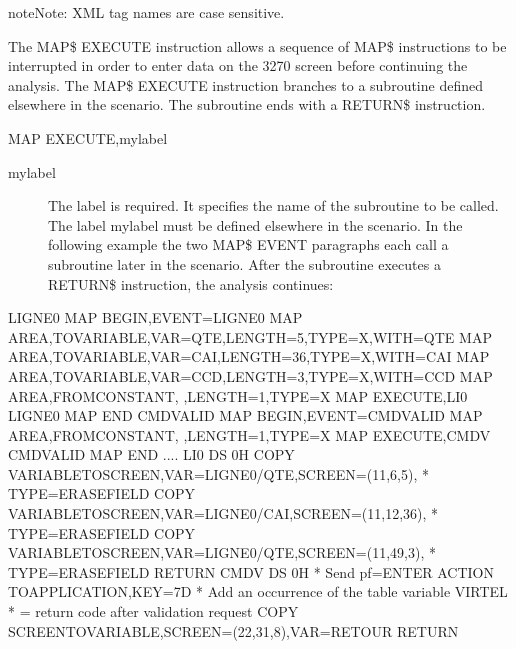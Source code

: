 \documentclass[letterpaper,10pt,english]{sphinxmanual}
\begin{document}
\begin{sphinxadmonition}{note}{Note:}
XML tag names are case sensitive.
\end{sphinxadmonition}
\label{\detokenize{User_Guide:v457ug-map-execute}}

The MAP\$ EXECUTE instruction allows a sequence of MAP\$ instructions to be interrupted in order to enter data on the
3270 screen before continuing the analysis. The MAP\$ EXECUTE instruction branches to a subroutine defined
elsewhere in the scenario. The subroutine ends with a RETURN\$ instruction.

\begin{sphinxVerbatim}[commandchars=\\\{\}]
MAP\PYGZdl{} EXECUTE,mylabel
\end{sphinxVerbatim}
\begin{description}
\item[{mylabel}] \leavevmode
The label is required. It specifies the name of the subroutine to be called. The label mylabel must be defined elsewhere in the scenario. In the following example the two MAP\$ EVENT paragraphs each call a subroutine later in the scenario. After the subroutine executes a RETURN\$ instruction, the analysis continues:

\end{description}

\begin{sphinxVerbatim}[commandchars=\\\{\}]
LIGNE0  MAP\PYGZdl{} BEGIN,EVENT=\PYGZsq{}LIGNE0\PYGZsq{}
        MAP\PYGZdl{} AREA,TO\PYGZhy{}VARIABLE,VAR=\PYGZsq{}QTE\PYGZsq{},LENGTH=5,TYPE=X,WITH=\PYGZsq{}QTE\PYGZsq{}
        MAP\PYGZdl{} AREA,TO\PYGZhy{}VARIABLE,VAR=\PYGZsq{}CAI\PYGZsq{},LENGTH=36,TYPE=X,WITH=\PYGZsq{}CAI\PYGZsq{}
        MAP\PYGZdl{} AREA,TO\PYGZhy{}VARIABLE,VAR=\PYGZsq{}CCD\PYGZsq{},LENGTH=3,TYPE=X,WITH=\PYGZsq{}CCD\PYGZsq{}
        MAP\PYGZdl{} AREA,FROM\PYGZhy{}CONSTANT,\PYGZsq{} \PYGZsq{},LENGTH=1,TYPE=X
        MAP\PYGZdl{} EXECUTE,LI0
LIGNE0  MAP\PYGZdl{} END
CMDVALID MAP\PYGZdl{} BEGIN,EVENT=\PYGZsq{}CMDVALID\PYGZsq{}
         MAP\PYGZdl{} AREA,FROM\PYGZhy{}CONSTANT,\PYGZsq{} \PYGZsq{},LENGTH=1,TYPE=X
         MAP\PYGZdl{} EXECUTE,CMDV
CMDVALID MAP\PYGZdl{} END
....
LI0 DS 0H
        COPY\PYGZdl{} VARIABLE\PYGZhy{}TO\PYGZhy{}SCREEN,VAR=\PYGZsq{}LIGNE0/QTE\PYGZsq{},SCREEN=(11,6,5), *
            TYPE=ERASE\PYGZhy{}FIELD
        COPY\PYGZdl{} VARIABLE\PYGZhy{}TO\PYGZhy{}SCREEN,VAR=\PYGZsq{}LIGNE0/CAI\PYGZsq{},SCREEN=(11,12,36), *
            TYPE=ERASE\PYGZhy{}FIELD
        COPY\PYGZdl{} VARIABLE\PYGZhy{}TO\PYGZhy{}SCREEN,VAR=\PYGZsq{}LIGNE0/QTE\PYGZsq{},SCREEN=(11,49,3), *
            TYPE=ERASE\PYGZhy{}FIELD
        RETURN\PYGZdl{}
CMDV DS 0H
* Send pf=ENTER
        ACTION\PYGZdl{} TO\PYGZhy{}APPLICATION,KEY=7D
* Add an occurrence of the table variable VIRTEL
* = return code after validation request
        COPY\PYGZdl{} SCREEN\PYGZhy{}TO\PYGZhy{}VARIABLE,SCREEN=(22,31,8),VAR=\PYGZsq{}RETOUR\PYGZsq{}
        RETURN\PYGZdl{}
\end{sphinxVerbatim}
\label{\detokenize{User_Guide:v457ug-map-from-field}}
\end{document}
